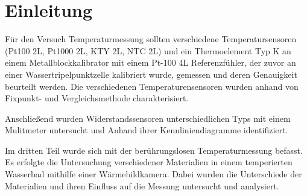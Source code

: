 \section{Einleitung}

Für den Versuch Temperaturmessung sollten verschiedene Temperatursensoren (Pt100 2L, Pt1000 2L, KTY 2L, NTC 2L) und ein Thermoelement Typ K an einem Metallblockkalibrator mit einem Pt-100 4L Referenzfühler, der zuvor an einer Wassertripelpunktzelle kalibriert wurde,  gemessen und deren Genauigkeit beurteilt werden. 
Die verschiedenen Temperaturensensoren wurden anhand von Fixpunkt- und Vergleichsmethode charakterisiert. 

Anschließend wurden Widerstandssensoren unterschiedlichen Typs mit einem Mulitmeter untersucht und Anhand ihrer Kennliniendiagramme identifiziert. 

Im dritten Teil wurde sich mit der berührungslosen Temperaturmessung befasst. Es erfolgte die Untersuchung verschiedener Materialien in einem temperierten Wasserbad mithilfe einer Wärmebildkamera. Dabei wurden die Unterschiede der Materialien und ihren Einfluss auf die Messung untersucht und analysiert. 